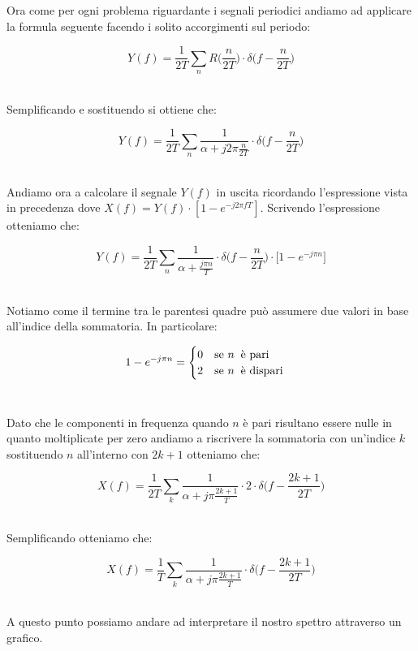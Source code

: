 \documentclass[../main.tex]{subfiles}
\begin{document}
Ora come per ogni problema riguardante i segnali periodici andiamo ad applicare la formula seguente facendo i solito accorgimenti sul periodo:

\[Y(f) = \frac{1}{2T} \sum_n R\bigg(\frac{n}{2T}\bigg) \cdot \delta\bigg( f - \frac{n}{2T} \bigg)  \]\

Semplificando e sostituendo si ottiene che:

\[ Y(f) = \frac{1}{2T} \sum_n \frac{1}{\alpha + j2\pi \tfrac{n}{2T}}  \cdot \delta\bigg( f - \frac{n}{2T} \bigg)  \]\

Andiamo ora a calcolare il segnale $Y(f)$ in uscita ricordando l'espressione vista in precedenza dove $X(f) = Y(f) \cdot [1 - e^{-j2\pi fT}]$. Scrivendo l'espressione otteniamo che:

\[ Y(f) = \frac{1}{2T} \sum_n \frac{1}{\alpha + \tfrac{j\pi n}{T}}  \cdot \delta\bigg( f - \frac{n}{2T} \bigg) \cdot \big[ 1 - e^{-j\pi n}  \big] \]\

Notiamo come il termine tra le parentesi quadre può assumere due valori in base all'indice della sommatoria. In particolare:

\[ 1 - e^{-j\pi n} = \begin{cases}

0 \hspace{10pt} $se $ n\;\;$è pari$\\
2 \hspace{10pt} $se $ n\;\;$è dispari$\\
	
\end{cases} \]\

Dato che le componenti in frequenza quando $n$ è pari risultano essere nulle in quanto moltiplicate per zero andiamo a riscrivere la sommatoria con un'indice $k$ sostituendo $n$ all'interno con $2k + 1$ otteniamo che:

\[X(f) = \frac{1}{2T} \sum_k \frac{1}{\alpha + j\pi \frac{2k+1}{T}} \cdot 2 \cdot \delta\bigg( f - \frac{2k+1}{2T} \bigg)   \]\

Semplificando otteniamo che:


\[X(f) = \frac{1}{T} \sum_k \frac{1}{\alpha + j\pi \frac{2k+1}{T}} \cdot \delta\bigg( f - \frac{2k+1}{2T} \bigg)   \]\

A questo punto possiamo andare ad interpretare il nostro spettro attraverso un grafico.










 




 
\end{document}
